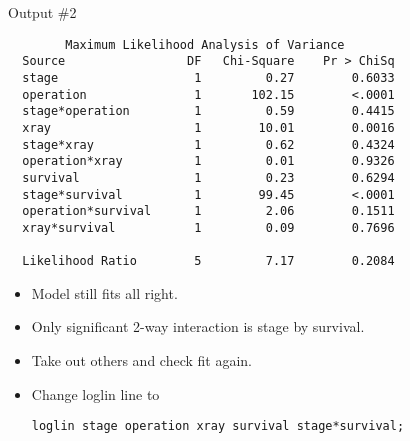 \documentclass[pdf]{prosper}
\begin{document}
\begin{slide}{Output \#2}

{\scriptsize
\begin{verbatim}
        Maximum Likelihood Analysis of Variance
  Source                 DF   Chi-Square    Pr > ChiSq
  stage                   1         0.27        0.6033
  operation               1       102.15        <.0001
  stage*operation         1         0.59        0.4415
  xray                    1        10.01        0.0016
  stage*xray              1         0.62        0.4324
  operation*xray          1         0.01        0.9326
  survival                1         0.23        0.6294
  stage*survival          1        99.45        <.0001
  operation*survival      1         2.06        0.1511
  xray*survival           1         0.09        0.7696

  Likelihood Ratio        5         7.17        0.2084

\end{verbatim}
}

\begin{itemize}
\item Model still fits all right.
\item Only significant 2-way interaction is stage by survival.
\item Take out others and check fit again.
\item Change loglin line to

{\small
\begin{verbatim}
loglin stage operation xray survival stage*survival;

\end{verbatim}
}
\end{itemize}
  
\end{slide}
\end{document}
